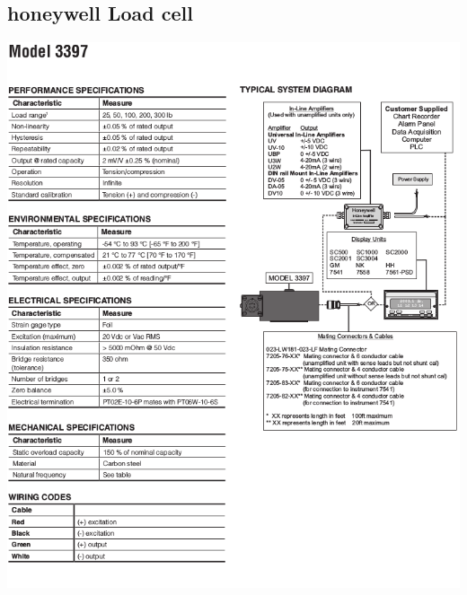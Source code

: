 \documentclass[paper=a4, fontsize=11pt, abstract=on]{scrartcl}
\numberwithin{equation}{section}		%
\numberwithin{figure}{section}			%
\numberwithin{table}{section}				%
\begin{document}
\subsection{honeywell Load cell}
\centering
\includegraphics[width=1.0\linewidth]{dload}
\end{document}
